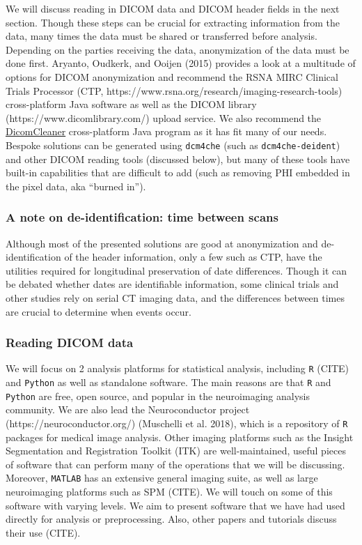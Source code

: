 \documentclass[]{elsarticle} %
\begin{document}
We will discuss reading in DICOM data and DICOM header fields in the next section. Though these steps can be crucial for extracting information from the data, many times the data must be shared or transferred before analysis. Depending on the parties receiving the data, anonymization of the data must be done first. Aryanto, Oudkerk, and Ooijen (2015) provides a look at a multitude of options for DICOM anonymization and recommend the RSNA MIRC Clinical Trials Processor (CTP, https://www.rsna.org/research/imaging-research-tools) cross-platform Java software as well as the DICOM library (https://www.dicomlibrary.com/) upload service. We also recommend the \href{https://www.dclunie.com/pixelmed/software/webstart/DicomCleanerUsage.html}{DicomCleaner} cross-platform Java program as it has fit many of our needs. Bespoke solutions can be generated using \texttt{dcm4che} (such as \texttt{dcm4che-deident}) and other DICOM reading tools (discussed below), but many of these tools have built-in capabilities that are difficult to add (such as removing PHI embedded in the pixel data, aka ``burned in'').

\hypertarget{a-note-on-de-identification-time-between-scans}{%
\subsubsection{A note on de-identification: time between scans}\label{a-note-on-de-identification-time-between-scans}}

Although most of the presented solutions are good at anonymization and de-identification of the header information, only a few such as CTP, have the utilities required for longitudinal preservation of date differences. Though it can be debated whether dates are identifiable information, some clinical trials and other studies rely on serial CT imaging data, and the differences between times are crucial to determine when events occur.

\hypertarget{reading-dicom-data}{%
\subsubsection{Reading DICOM data}\label{reading-dicom-data}}

We will focus on 2 analysis platforms for statistical analysis, including \texttt{R} (CITE) and \texttt{Python} as well as standalone software. The main reasons are that \texttt{R} and \texttt{Python} are free, open source, and popular in the neuroimaging analysis community. We are also lead the Neuroconductor project (https://neuroconductor.org/) (Muschelli et al. 2018), which is a repository of \texttt{R} packages for medical image analysis. Other imaging platforms such as the Insight Segmentation and Registration Toolkit (ITK) are well-maintained, useful pieces of software that can perform many of the operations that we will be discussing. Moreover, \texttt{MATLAB} has an extensive general imaging suite, as well as large neuroimaging platforms such as SPM (CITE). We will touch on some of this software with varying levels. We aim to present software that we have had used directly for analysis or preprocessing. Also, other papers and tutorials discuss their use (CITE).
\end{document}
